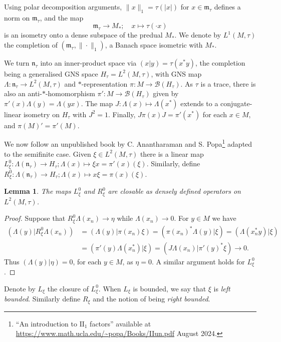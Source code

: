 \documentclass[a4paper,11pt]{article}
\newcommand{\mc}[1]{{\mathcal{#1}}}
\newcommand{\mf}[1]{{\mathfrak{#1}}}
\newtheorem{lemma}{Lemma}[section]
\theoremstyle{definition}
\begin{document}
Using polar decomposition arguments, $\|x\|_1 = \tau(|x|)$ for $x\in\mf m_\tau$ defines a norm on $\mf m_\tau$, and the map
\[ \mf m_\tau \to M_*; \quad x \mapsto \tau(\cdot x) \]
is an isometry onto a dense subspace of the predual $M_*$.  We denote by $L^1(M,\tau)$ the completion of $(\mf m_\tau, \|\cdot\|_1)$, a Banach space isometric with $M_*$.

We turn $\mf n_\tau$ into an inner-product space via $(x|y) = \tau(x^*y)$, the completion being a generalised GNS space $H_\tau = L^2(M,\tau)$, with GNS map $\Lambda\colon \mf n_\tau\to L^2(M,\tau)$ and $*$-representation $\pi\colon M \to \mc B(H_\tau)$.  As $\tau$ is a trace, there is also an anti-$*$-homomorphism $\pi'\colon M \to \mc B(H_\tau)$ given by $\pi'(x) \Lambda(y) = \Lambda(yx)$.  The map $J\colon \Lambda(x) \mapsto \Lambda(x^*)$ extends to a conjugate-linear isometry on $H_\tau$ with $J^2=1$.  Finally, $J\pi(x)J = \pi'(x^*)$ for each $x\in M$, and $\pi(M)' = \pi'(M)$.

We now follow an unpublished book by C. Anantharaman and S. Popa\footnote{``An introduction to $\textrm{II}_1$ factors'' available at \url{https://www.math.ucla.edu/~popa/Books/IIun.pdf} August 2024.} adapted to the semifinite case.
Given $\xi\in L^2(M,\tau)$ there is a linear map $L_\xi^0 \colon \Lambda(\mf n_\tau) \to H_\tau; \Lambda(x) \mapsto \xi x = \pi'(x)(\xi)$.  Similarly, define $R_\xi^0 \colon \Lambda(\mf n_\tau) \to H_\tau; \Lambda(x) \mapsto x \xi = \pi(x)(\xi)$.

\begin{lemma}
The maps $L_\xi^0$ and $R_\xi^0$ are closable as densely defined operators on $L^2(M,\tau)$.
\end{lemma}
\begin{proof}
Suppose that $R_\xi^0\Lambda(x_n) \to \eta$ while $\Lambda(x_n) \to 0$.  For $y\in M$ we have
\begin{align*}
(\Lambda(y) | R_\xi^0\Lambda(x_n))
&= (\Lambda(y) | \pi(x_n)\xi)
= (\pi(x_n)^*\Lambda(y) | \xi)
= (\Lambda(x_n^*y)|\xi) \\
&= (\pi'(y)\Lambda(x_n^*)|\xi)
= (J\Lambda(x_n)|\pi'(y)^*\xi) \to 0.
\end{align*}
Thus $(\Lambda(y)|\eta)=0$, for each $y\in M$, as $\eta=0$.  A similar argument holds for $L_\xi^0$.
\end{proof}

Denote by $L_\xi$ the closure of $L_\xi^0$.  When $L_\xi$ is bounded, we say that $\xi$ is \emph{left bounded}.  Similarly define $R_\xi$ and the notion of being \emph{right bounded}.
\end{document}
